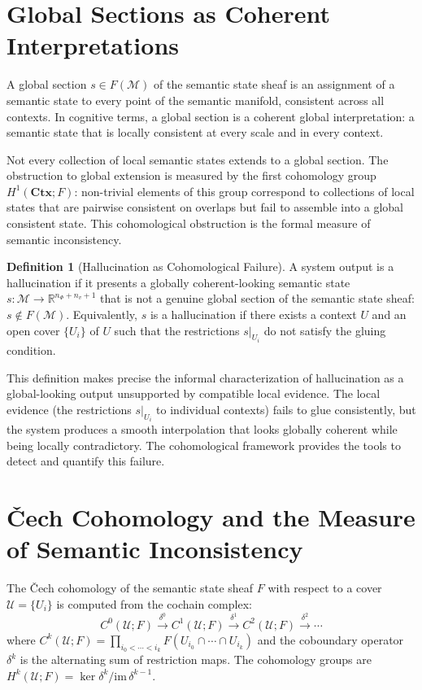 \documentclass[12pt, a4paper, openany]{book}
\theoremstyle{plain}
\theoremstyle{definition}
\newtheorem{definition}[theorem]{Definition}
\theoremstyle{remark}
\begin{document}
\section{Global Sections as Coherent Interpretations}

A global section $s \in F(\mathcal{M})$ of the semantic state sheaf is an assignment of a semantic state to every point of the semantic manifold, consistent across all contexts. In cognitive terms, a global section is a coherent global interpretation: a semantic state that is locally consistent at every scale and in every context.

Not every collection of local semantic states extends to a global section. The obstruction to global extension is measured by the first cohomology group $H^1(\mathbf{Ctx}; F)$: non-trivial elements of this group correspond to collections of local states that are pairwise consistent on overlaps but fail to assemble into a global consistent state. This cohomological obstruction is the formal measure of semantic inconsistency.

\begin{definition}[Hallucination as Cohomological Failure]
A system output is a hallucination if it presents a globally coherent-looking semantic state $s: \mathcal{M} \to \mathbb{R}^{n_\Phi + n_v + 1}$ that is not a genuine global section of the semantic state sheaf: $s \notin F(\mathcal{M})$. Equivalently, $s$ is a hallucination if there exists a context $U$ and an open cover $\{U_i\}$ of $U$ such that the restrictions $s|_{U_i}$ do not satisfy the gluing condition.
\end{definition}

This definition makes precise the informal characterization of hallucination as a global-looking output unsupported by compatible local evidence. The local evidence (the restrictions $s|_{U_i}$ to individual contexts) fails to glue consistently, but the system produces a smooth interpolation that looks globally coherent while being locally contradictory. The cohomological framework provides the tools to detect and quantify this failure.

\section{Čech Cohomology and the Measure of Semantic Inconsistency}

The Čech cohomology of the semantic state sheaf $F$ with respect to a cover $\mathcal{U} = \{U_i\}$ is computed from the cochain complex:
\[
C^0(\mathcal{U}; F) \xrightarrow{\delta^0} C^1(\mathcal{U}; F) \xrightarrow{\delta^1} C^2(\mathcal{U}; F) \xrightarrow{\delta^2} \cdots
\]
where $C^k(\mathcal{U}; F) = \prod_{i_0 < \cdots < i_k} F(U_{i_0} \cap \cdots \cap U_{i_k})$ and the coboundary operator $\delta^k$ is the alternating sum of restriction maps. The cohomology groups are $H^k(\mathcal{U}; F) = \ker \delta^k / \mathrm{im}\, \delta^{k-1}$.
\end{document}
